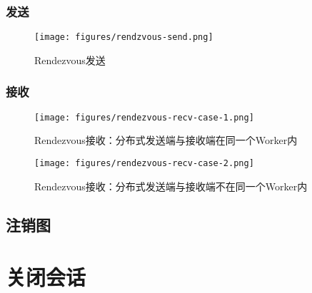 \begin{content}
\subsubsection{发送}

\begin{figure}[H]
\centering
\texttt{[image: figures/rendzvous-send.png]}
\caption{Rendezvous发送}
 \label{fig:rendzvous-send}
\end{figure}

\subsubsection{接收}

\begin{figure}[H]
\centering
\texttt{[image: figures/rendezvous-recv-case-1.png]}
\caption{Rendezvous接收：分布式发送端与接收端在同一个Worker内}
 \label{fig:rendezvous-recv-case-1}
\end{figure}

\begin{figure}[H]
\centering
\texttt{[image: figures/rendezvous-recv-case-2.png]}
\caption{Rendezvous接收：分布式发送端与接收端不在同一个Worker内}
 \label{fig:rendezvous-recv-case-2}
\end{figure}

\subsection{注销图}

\end{content}

\section{关闭会话}

